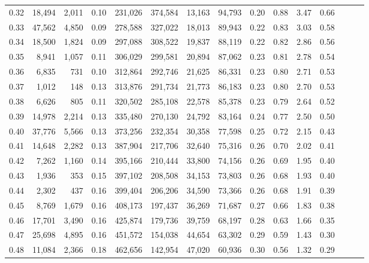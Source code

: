 \begin{tabular}{rrrrrrrrrrrrrrr}
0.32 &  18,494 &  2,011 &  0.10 &  231,026 &  374,584 &   13,163 &   94,793 &  0.20 &  0.88 &  3.47 &      0.66 \\
0.33 &  47,562 &  4,850 &  0.09 &  278,588 &  327,022 &   18,013 &   89,943 &  0.22 &  0.83 &  3.03 &      0.58 \\
0.34 &  18,500 &  1,824 &  0.09 &  297,088 &  308,522 &   19,837 &   88,119 &  0.22 &  0.82 &  2.86 &      0.56 \\
0.35 &   8,941 &  1,057 &  0.11 &  306,029 &  299,581 &   20,894 &   87,062 &  0.23 &  0.81 &  2.78 &      0.54 \\
0.36 &   6,835 &    731 &  0.10 &  312,864 &  292,746 &   21,625 &   86,331 &  0.23 &  0.80 &  2.71 &      0.53 \\
0.37 &   1,012 &    148 &  0.13 &  313,876 &  291,734 &   21,773 &   86,183 &  0.23 &  0.80 &  2.70 &      0.53 \\
0.38 &   6,626 &    805 &  0.11 &  320,502 &  285,108 &   22,578 &   85,378 &  0.23 &  0.79 &  2.64 &      0.52 \\
0.39 &  14,978 &  2,214 &  0.13 &  335,480 &  270,130 &   24,792 &   83,164 &  0.24 &  0.77 &  2.50 &      0.50 \\
0.40 &  37,776 &  5,566 &  0.13 &  373,256 &  232,354 &   30,358 &   77,598 &  0.25 &  0.72 &  2.15 &      0.43 \\
0.41 &  14,648 &  2,282 &  0.13 &  387,904 &  217,706 &   32,640 &   75,316 &  0.26 &  0.70 &  2.02 &      0.41 \\
0.42 &   7,262 &  1,160 &  0.14 &  395,166 &  210,444 &   33,800 &   74,156 &  0.26 &  0.69 &  1.95 &      0.40 \\
0.43 &   1,936 &    353 &  0.15 &  397,102 &  208,508 &   34,153 &   73,803 &  0.26 &  0.68 &  1.93 &      0.40 \\
0.44 &   2,302 &    437 &  0.16 &  399,404 &  206,206 &   34,590 &   73,366 &  0.26 &  0.68 &  1.91 &      0.39 \\
0.45 &   8,769 &  1,679 &  0.16 &  408,173 &  197,437 &   36,269 &   71,687 &  0.27 &  0.66 &  1.83 &      0.38 \\
0.46 &  17,701 &  3,490 &  0.16 &  425,874 &  179,736 &   39,759 &   68,197 &  0.28 &  0.63 &  1.66 &      0.35 \\
0.47 &  25,698 &  4,895 &  0.16 &  451,572 &  154,038 &   44,654 &   63,302 &  0.29 &  0.59 &  1.43 &      0.30 \\
0.48 &  11,084 &  2,366 &  0.18 &  462,656 &  142,954 &   47,020 &   60,936 &  0.30 &  0.56 &  1.32 &      0.29 \\

\end{tabular}
